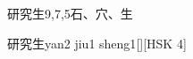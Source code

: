 \begin{entry}{研究生}{9,7,5}{⽯、⽳、⽣}
  \begin{phonetics}{研究生}{yan2 jiu1 sheng1}[][HSK 4]
  \end{phonetics}
\end{entry}
